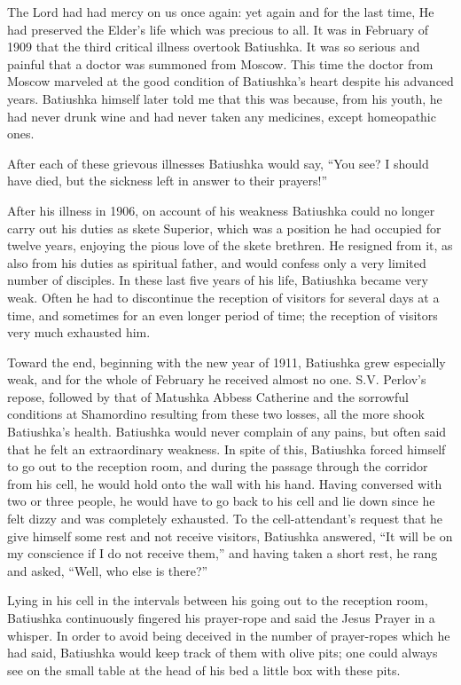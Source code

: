 The Lord had had mercy on us once again: yet again and for the last time, He had preserved the Elder's life which was precious to all. It was in February of 1909 that the third critical illness overtook Batiushka. It was so serious and painful that a doctor was summoned from Moscow. This time the doctor from Moscow marveled at the good condition of Batiushka's heart despite his advanced years. Batiushka himself later told me that this was because, from his youth, he had never drunk wine and had never taken any medicines, except homeopathic ones.

After each of these grievous illnesses Batiushka would say, ``You see? I should have died, but the sickness left in answer to their prayers!''

After his illness in 1906, on account of his weakness Batiushka could no longer carry out his duties as skete Superior, which was a position he had occupied for twelve years, enjoying the pious love of the skete brethren. He resigned from it, as also from his duties as spiritual father, and would confess only a very limited number of disciples. In these last five years of his life, Batiushka became very weak. Often he had to discontinue the reception of visitors for several days at a time, and sometimes for an even longer period of time; the reception of visitors very much exhausted him.

Toward the end, beginning with the new year of 1911, Batiushka grew especially weak, and for the whole of February he received almost no one. S.V. Perlov's repose, followed by that of Matushka Abbess Catherine and the sorrowful conditions at Shamordino resulting from these two losses, all the more shook Batiushka's health. Batiushka would never complain of any pains, but often said that he felt an extraordinary weakness. In spite of this, Batiushka forced himself to go out to the reception room, and during the passage through the corridor from his cell, he would hold onto the wall with his hand. Having conversed with two or three people, he would have to go back to his cell and lie down since he felt dizzy and was completely exhausted. To the cell-attendant's request that he give himself some rest and not receive visitors, Batiushka answered, ``It will be on my conscience if I do not receive them,'' and having taken a short rest, he rang and asked, ``Well, who else is there?''

Lying in his cell in the intervals between his going out to the reception room, Batiushka continuously fingered his prayer-rope and said the Jesus Prayer in a whisper. In order to avoid being deceived in the number of prayer-ropes which he had said, Batiushka would keep track of them with olive pits; one could always see on the small table at the head of his bed a little box with these pits.

